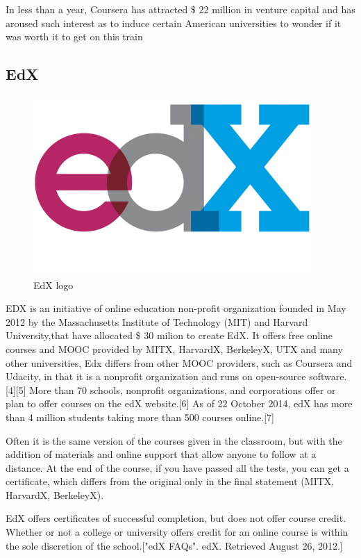 In less than a year, Coursera has attracted \$ 22 million in venture capital and has aroused such interest as to induce certain American universities to wonder if it was worth it to get on this train

\subsection{EdX}
\label{subsec:EdX}
\begin{figure}[htb] %
 \centering
 \includegraphics[width=0.5\linewidth]{images/chapter1/edx_logo.png}\hfill
 \caption[EdX logo]{EdX logo}
 \label{fig:fourV}
\end{figure}

EDX is an initiative of online education non-profit organization founded in May 2012 by the Massachusetts Institute of Technology (MIT) and Harvard University,that have allocated \$ 30 milion to create EdX.
It offers free online courses and MOOC provided by MITX, HarvardX, BerkeleyX, UTX and many other universities, Edx differs from other MOOC providers, such as Coursera and Udacity, in that it is a nonprofit organization and runs on open-source software.[4][5]
More than 70 schools, nonprofit organizations, and corporations offer or plan to offer courses on the edX website.[6] 
As of 22 October 2014, edX has more than 4 million students taking more than 500 courses online.[7]

Often it is the same version of the courses given in the classroom, but with the addition of materials and online support that allow anyone to follow at a distance. At the end of the course, if you have passed all the tests, you can get a certificate, which differs from the original only in the final statement (MITX, HarvardX, BerkeleyX).


EdX offers certificates of successful completion, but does not offer course credit. Whether or not a college or university offers credit for an online course is within the sole discretion of the school.["edX FAQs". edX. Retrieved August 26, 2012.]

